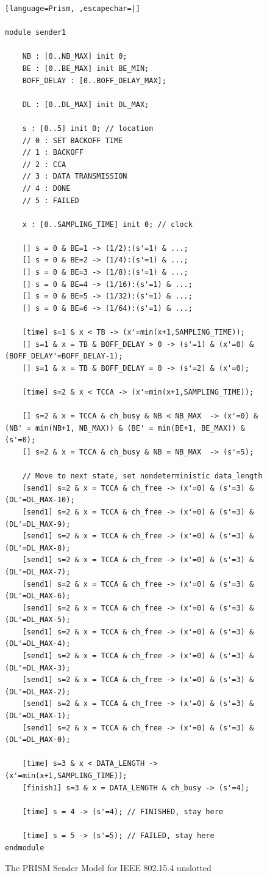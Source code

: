 \documentclass[
a4paper,
12pt
]{scrartcl}
\begin{document}
\begin{figure}[H]
\begin{lstlisting}[language=Prism, ,escapechar=|]

module sender1

	NB : [0..NB_MAX] init 0;
	BE : [0..BE_MAX] init BE_MIN;
	BOFF_DELAY : [0..BOFF_DELAY_MAX];

	DL : [0..DL_MAX] init DL_MAX;

	s : [0..5] init 0; // location
	// 0 : SET BACKOFF TIME
	// 1 : BACKOFF
	// 2 : CCA
	// 3 : DATA TRANSMISSION
	// 4 : DONE
	// 5 : FAILED

	x : [0..SAMPLING_TIME] init 0; // clock

	[] s = 0 & BE=1 -> (1/2):(s'=1) & ...;
	[] s = 0 & BE=2 -> (1/4):(s'=1) & ...;
	[] s = 0 & BE=3 -> (1/8):(s'=1) & ...;
	[] s = 0 & BE=4 -> (1/16):(s'=1) & ...;
	[] s = 0 & BE=5 -> (1/32):(s'=1) & ...;
	[] s = 0 & BE=6 -> (1/64):(s'=1) & ...;

	[time] s=1 & x < TB -> (x'=min(x+1,SAMPLING_TIME));
	[] s=1 & x = TB & BOFF_DELAY > 0 -> (s'=1) & (x'=0) & (BOFF_DELAY'=BOFF_DELAY-1);
	[] s=1 & x = TB & BOFF_DELAY = 0 -> (s'=2) & (x'=0);

	[time] s=2 & x < TCCA -> (x'=min(x+1,SAMPLING_TIME));
	
	[] s=2 & x = TCCA & ch_busy & NB < NB_MAX  -> (x'=0) & (NB' = min(NB+1, NB_MAX)) & (BE' = min(BE+1, BE_MAX)) & (s'=0);
	[] s=2 & x = TCCA & ch_busy & NB = NB_MAX  -> (s'=5);

	// Move to next state, set nondeterministic data_length
	[send1] s=2 & x = TCCA & ch_free -> (x'=0) & (s'=3) & (DL'=DL_MAX-10);
	[send1] s=2 & x = TCCA & ch_free -> (x'=0) & (s'=3) & (DL'=DL_MAX-9);
	[send1] s=2 & x = TCCA & ch_free -> (x'=0) & (s'=3) & (DL'=DL_MAX-8);
	[send1] s=2 & x = TCCA & ch_free -> (x'=0) & (s'=3) & (DL'=DL_MAX-7);
	[send1] s=2 & x = TCCA & ch_free -> (x'=0) & (s'=3) & (DL'=DL_MAX-6);
	[send1] s=2 & x = TCCA & ch_free -> (x'=0) & (s'=3) & (DL'=DL_MAX-5);
	[send1] s=2 & x = TCCA & ch_free -> (x'=0) & (s'=3) & (DL'=DL_MAX-4);
	[send1] s=2 & x = TCCA & ch_free -> (x'=0) & (s'=3) & (DL'=DL_MAX-3);
	[send1] s=2 & x = TCCA & ch_free -> (x'=0) & (s'=3) & (DL'=DL_MAX-2);
	[send1] s=2 & x = TCCA & ch_free -> (x'=0) & (s'=3) & (DL'=DL_MAX-1);
	[send1] s=2 & x = TCCA & ch_free -> (x'=0) & (s'=3) & (DL'=DL_MAX-0);

	[time] s=3 & x < DATA_LENGTH -> (x'=min(x+1,SAMPLING_TIME));
	[finish1] s=3 & x = DATA_LENGTH & ch_busy -> (s'=4);

	[time] s = 4 -> (s'=4); // FINISHED, stay here

	[time] s = 5 -> (s'=5); // FAILED, stay here
endmodule

\end{lstlisting}
\caption{The PRISM Sender Model for IEEE 802.15.4 unslotted}
\label{fig:sendermodel}
\end{figure}
\end{document}
